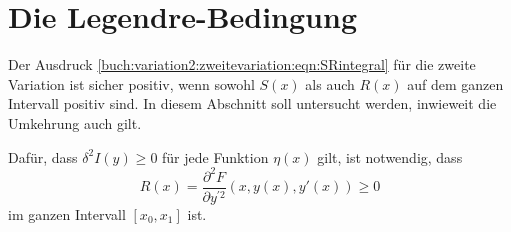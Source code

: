 %
%
%
\section{Die Legendre-Bedingung
\label{buch:variation2:section:legendre}}
Der Ausdruck \eqref{buch:variation2:zweitevariation:eqn:SRintegral}
für die zweite Variation ist sicher positiv, wenn sowohl $S(x)$
als auch $R(x)$ auf dem ganzen Intervall positiv sind.
In diesem Abschnitt soll untersucht werden, inwieweit die
Umkehrung auch gilt.

\begin{satz}
\label{buch:variation2:legendre:satz:legendre}
Dafür, dass $\delta^2I(y)\ge 0$ für jede Funktion $\eta(x)$ gilt, ist
notwendig, dass
\[
R(x)
=
\frac{\partial^2F}{\partial y^{\prime 2}}(x,y(x),y'(x))
\ge
0
\]
im ganzen Intervall $[x_0,x_1]$ ist.
\end{satz}

